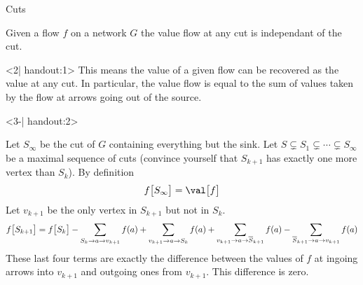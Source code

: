 \documentclass[32pt, aspectratio=169]{beamer}
\begin{document}
\begin{frame}{Cuts}
  \begin{prop}
    Given a flow $f$ on a network $G$ the value flow at any cut
    is independant of the cut.
  \end{prop}
  \begin{overlayarea}{\textwidth}{.65\textheight}
    \begin{onlyenv}<2| handout:1>
      \vspace{2pt}
      This means the value of a given flow can be recovered as the
      value at any cut. In particular, the value flow is equal to the
      sum of values taken by the flow at arrows going out of the
      source.
    \end{onlyenv}

    \begin{onlyenv}<3-| handout:2>
      \vspace{2pt}
      \begin{demo}
    Let $S_\infty$ be the cut of $G$ containing everything but the
    sink. Let
    $S \subsetneq S_1 \subsetneq \cdots \subsetneq S_\infty$ be a
    maximal sequence of cuts (convince yourself that $S_{k+1}$ has
    exactly one more vertex than $S_k$). By definition
    \begin{displaymath}
      f\big[S_\infty\big] = \val\big[f\big]
    \end{displaymath}
    Let $v_{k+1}$ be the only vertex in $S_{k+1}$ but not in $S_k$.
    \begin{displaymath}
      f\big[S_{k+1}\big]  =
      f\big[S_{k}\big] - \sum_{S_{k} \to a \to v_{k+1}} f(a)
      + \sum_{v_{k+1} \to a \to S_{k}} f(a)
       + \sum_{v_{k+1} \to a \to \smash{\overline{S}}_{k+1}} f(a)
      - \sum_{\smash{\overline{S}_{k+1}}\to a \to v_{k+1}} f(a)
    \end{displaymath}
    These last four terms are exactly the difference between the
    values of $f$ at ingoing arrows into $v_{k+1}$ and outgoing ones
    from $v_{k+1}$. This difference is zero.
  \end{demo}
\end{onlyenv}
\end{overlayarea}
\end{frame}
\end{document}
